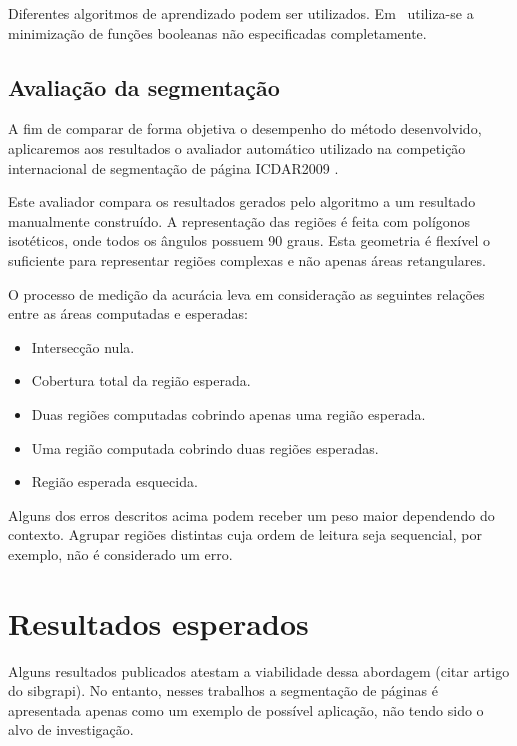 \documentclass[times, 10pt,twocolumn]{article}
\begin{document}
Diferentes algoritmos de aprendizado podem ser
utilizados. Em~\cite{Tomita:1996:PrAuMa} utiliza-se a minimização de
funções booleanas não especificadas completamente.


\subsection{Avaliação da segmentação}

A fim de comparar de forma objetiva o desempenho do método desenvolvido, aplicaremos aos resultados o avaliador automático
utilizado na competição internacional de segmentação de página ICDAR2009 \cite{DBLP:conf/icdar/2009}.

Este avaliador compara os resultados gerados pelo algoritmo a um resultado manualmente construído.
A representação das regiões é feita com polígonos isotéticos, onde todos os ângulos possuem 90 graus.
Esta geometria é flexível o suficiente para representar regiões complexas e não apenas áreas retangulares.


O processo de medição da acurácia leva em consideração as seguintes relações entre as áreas computadas
e esperadas:

\begin{itemize}
	\item Intersecção nula.
	\item Cobertura total da região esperada.
	\item Duas regiões computadas cobrindo apenas uma região esperada.
	\item Uma região computada cobrindo duas regiões esperadas.
	\item Região esperada esquecida.
\end{itemize}

Alguns dos erros descritos acima podem receber um peso maior dependendo do contexto. Agrupar regiões distintas
cuja ordem de leitura seja sequencial, por exemplo, não é considerado um erro.

\section{Resultados esperados}

Alguns resultados publicados atestam a viabilidade dessa abordagem
(citar artigo do sibgrapi). No entanto, nesses trabalhos a segmentação %
de páginas é apresentada apenas como um exemplo de possível aplicação,
não tendo sido o alvo de investigação.
\end{document}
